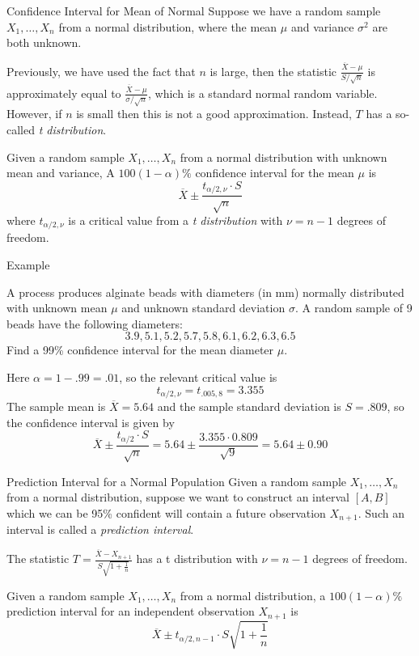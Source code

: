 \documentclass[t,handout]{beamer}
\begin{document}
    \begin{frame}{Confidence Interval for Mean of Normal}
        Suppose we have a random sample $X_1,\dots,X_n$ from a normal distribution, where the mean $\mu$ and variance $\sigma^2$ are both unknown. 
        
        \pause \vspace{.2cm}Previously, we have used the fact that $n$ is large, then the statistic $\frac{\overline{X}-\mu}{S/\sqrt{n}}$ is approximately equal to $\frac{\overline{X}-\mu}{\sigma/\sqrt{n}}$, which is a standard normal random variable. However, if $n$ is small then this is not a good approximation. Instead, $T$ has a so-called \emph{t distribution}.
        
        \pause \begin{block}{}
        Given a random sample $X_1,\dots,X_n$ from a normal distribution with unknown mean and variance,
        A $100(1-\alpha)\%$ confidence interval for the mean $\mu$ is
        $$\overline{X} \pm \frac{t_{\alpha/2,\nu}\cdot S}{\sqrt{n}}$$
        where $t_{\alpha/2,\nu}$ is a critical value from a \emph{t distribution} with $\nu=n-1$ degrees of freedom.
        \end{block}
        \end{frame}
\begin{frame}{Example}
\begin{block}{}
A process produces alginate beads
with diameters (in mm) normally distributed with unknown mean $\mu$ and unknown standard deviation $\sigma$. A random sample of 9 beads have the following diameters:
$$3.9, 5.1, 5.2, 5.7, 5.8, 6.1, 6.2, 6.3, 6.5$$
Find a 99\% confidence interval for the mean diameter $\mu$.
\end{block}
\pause Here $\alpha=1-.99=.01$, so the relevant critical value is 
$$t_{\alpha/2,\nu}=t_{.005,8} = 3.355$$
\pause The sample mean is $\overline X=5.64$ and the sample standard deviation is $S=.809$, so the confidence interval is given by
$$\overline X \pm \frac{t_{\alpha/2} \cdot S}{\sqrt n} = 5.64 \pm \frac{3.355 \cdot 0.809}{\sqrt{9}} = 5.64 \pm  0.90$$
\end{frame}

\begin{frame}{Prediction Interval for a Normal Population}
    Given a random sample $X_1,\dots,X_n$ from a normal distribution, suppose we want to construct an interval $[A,B]$ which we can be 95\% confident will contain a future observation $X_{n+1}$. Such an interval is called a \emph{prediction interval}.
    
    \vspace{.2cm}\pause The statistic $T=\frac{\overline X-X_{n+1}}{S\sqrt{1+\frac1n}}$ has a t distribution with $\nu=n-1$ degrees of freedom.
    \begin{block}{}
    Given a random sample $X_1,\dots,X_n$ from a normal distribution, a $100(1-\alpha)\%$ prediction interval for an independent observation $X_{n+1}$ is
    $$\overline X \pm t_{\alpha/2,n-1}\cdot S\sqrt{1+\frac1n}$$
    \end{block}
    \end{frame}
    
\end{document}
